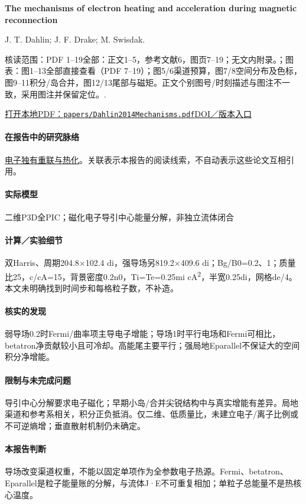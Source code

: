 \documentclass[UTF8,a4paper,11pt,openany,fontset=fandol]{ctexbook}
\begin{document}
\textbf{The mechanisms of electron heating and acceleration during magnetic reconnection}\citep{Dahlin2014Mechanisms}\

J. T. Dahlin;  J. F. Drake;  M. Swisdak.

\textsf{核读范围：}PDF 1–19全部：正文1–5，参考文献6，图页7–19；无文内附录。；\textsf{图表：}图1–13全部直接查看（PDF 7–19）；图5/6渠道预算，图7/8空间分布及色标，图9–11积分/岛合并，图12/13尾部与磁矩。正文个别图号/时刻描述与图注不一致，采用图注并保留定位。.

\href{run:../papers/Dahlin2014Mechanisms.pdf}{打开本地PDF：\texttt{papers/Dahlin2014Mechanisms.pdf}}\quad\href{https://doi.org/10.1063/1.4894484}{DOI／版本入口}

\paragraph{在报告中的研究脉络}\hyperref[story:energy]{电子独有重联与热化}。关联表示本报告的阅读线索，不自动表示这些论文互相引用。

\paragraph{实际模型}二维P3D全PIC；磁化电子导引中心能量分解，非独立流体闭合

\paragraph{计算／实验细节}双Harris、周期204.8×102.4 di，强导场另819.2×409.6 di；Bg/B0=0.2、1；质量比25，c/cA=15，背景密度0.2n0，Ti=Te=0.25mi cA\textsuperscript{2}，半宽0.25di，网格de/4。本文未明确找到时间步和每格粒子数，不补造。

\paragraph{核实的发现}弱导场0.2时Fermi/曲率项主导电子增能；导场1时平行电场和Fermi可相比，betatron净贡献较小且可冷却。高能尾主要平行；强局地Eparallel不保证大的空间积分净增能。

\paragraph{限制与未完成问题}导引中心分解要求电子磁化；早期小岛/合并尖锐结构中与真实增能有差异。局地渠道和参考系相关，积分正负抵消。仅二维、低质量比，未建立电子/离子比例或不可逆熵增；垂直散射机制仍未确定。

\paragraph{本报告判断}导场改变渠道权重，不能以固定单项作为全参数电子热源。Fermi、betatron、Eparallel是粒子能量账的分解，与流体J·E不可重复相加；单粒子总能量不是热核心温度。
\end{document}
